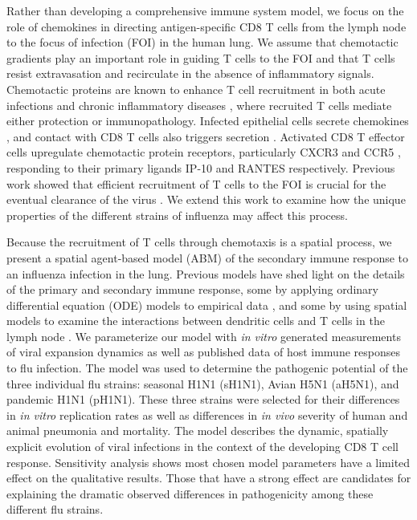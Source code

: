 \documentclass[10pt]{article}
\begin{document}
Rather than developing a comprehensive immune system model, we focus on the role of chemokines in directing antigen-specific CD8 T cells from the lymph node to the focus of infection (FOI) in the human lung.  We assume that chemotactic gradients play an important role in guiding T cells to the FOI and that T cells resist extravasation and recirculate in the absence of inflammatory signals.  Chemotactic proteins are known to enhance T cell recruitment in both acute infections and chronic inflammatory diseases \cite{Bromley2008, Medoff2005, Castellino2006 ,Gunn1998, Okada2005}, where recruited T cells mediate either protection or immunopathology.  Infected epithelial cells secrete chemokines \cite{Chan2005}, and contact with CD8 T cells also triggers secretion \cite{Zhao2000}. Activated CD8 T effector cells upregulate chemotactic protein receptors, particularly CXCR3 and CCR5 \cite{Hoji2005, Groom2011a}, responding to their primary ligands IP-10 and RANTES respectively.  Previous work showed that efficient recruitment of T cells to the FOI is crucial for the eventual clearance of the virus \cite{Cerwenka1999, Kim2011}.  We extend this work to examine how the unique properties of the different strains of influenza may affect this process.

Because the recruitment of T cells through chemotaxis is a spatial process, we present a spatial agent-based model (ABM) of the secondary immune response to an influenza infection in the lung.  Previous models have shed light on the details of the primary and secondary immune response, some by applying ordinary differential equation (ODE) models to empirical data \cite{Miao2010, Saenz2010, Handel2008, Lee2009, Murillo2013}, and some by using spatial models to examine the interactions between dendritic cells and T cells in the lymph node \cite{Beltman2007, Zheng2008, Vroomans2012, Textor2014}.  We parameterize our model with \textit{in vitro} generated measurements of viral expansion dynamics as well as published data of host immune responses to flu infection.  The model was used to determine the pathogenic potential of the three individual flu strains: seasonal H1N1 (sH1N1), Avian H5N1 (aH5N1), and pandemic H1N1 (pH1N1).  These three strains were selected for their differences in \textit{in vitro} replication rates \cite{Mitchell2011} as well as differences in \textit{in vivo} severity of human and animal pneumonia and mortality.  The model describes the dynamic, spatially explicit evolution of viral infections in the context of the developing CD8 T cell response.  Sensitivity analysis shows most chosen model parameters have a limited effect on the qualitative results.   Those that have a strong effect are candidates for explaining the dramatic observed differences in pathogenicity among these different flu strains.
\end{document}
